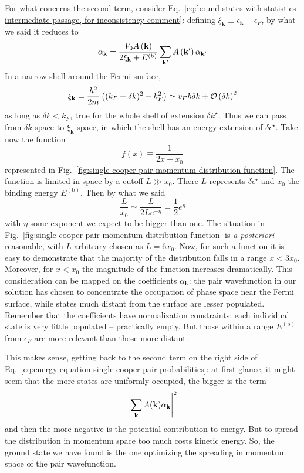 For what concerns the second term, consider Eq.~\eqref{eq:bound states with statistics intermediate passage, for inconsistency comment}: defining $\xi_\mathbf{k} \equiv \epsilon_\mathbf{k} - \epsilon_F$, by what we said it reduces to
\[
	\alpha_\mathbf{k} = \frac{V_0 A\left({\mathbf{k}}\right)}{2 \xi_\mathbf{k} + E^{(\mathrm{b})}} \sum_{\mathbf{k}'} A\left({\mathbf{k}'}\right) \alpha_{\mathbf{k}'}
\]
In a narrow shell around the Fermi surface,
\[
	\xi_\mathbf{k} = \frac{\hbar^2}{2m} \left({(k_F + \delta k)^2 - k_F^2}\right) \simeq v_F \hbar \delta k + \mathcal{O}\left({\delta k}\right)^2
\]
as long as $\delta k < k_F$, true for the whole shell of extension $\delta k^\star$. Thus we can pass from $\delta k$ space to $\xi_\mathbf{k}$ space, in which the shell has an energy extension of $\delta \epsilon^\star$. Take now the function
\[
	f(x) \equiv \frac{1}{2x+x_0}
\]
represented in Fig.~\ref{fig:single cooper pair momentum distribution function}. The function is limited in space by a cutoff $L \gg x_0$. There $L$ represents $\delta\epsilon^\star$ and $x_0$ the binding energy $E^{(\mathrm{b})}$. Then by what we said
\[
	\frac{L}{x_0} \simeq \frac{L}{2L e^{-\eta}} = \frac{1}{2} e^\eta
\]
with $\eta$ some exponent we expect to be bigger than one. The situation in Fig.~\ref{fig:single cooper pair momentum distribution function} is \textit{a posteriori} reasonable, with $L$ arbitrary chosen as $L=6x_0$. Now, for such a function it is easy to demonstrate that the majority of the distribution falls in a range $x < 3x_0$. Moreover, for $x<x_0$ the magnitude of the function increases dramatically. This consideration can be mapped on the coefficients $\alpha_\mathbf{k}$: the pair wavefunction in our solution has chosen to concentrate the occupation of phase space near the Fermi surface, while states much distant from the surface are lesser populated. Remember that the coefficients have normalization constraints: each individual state is very little populated -- practically empty. But those within a range $E^{(\mathrm{b})}$ from $\epsilon_F$ are more relevant than those more distant.

This makes sense, getting back to the second term on the right side of Eq.~\eqref{eq:energy equation single cooper pair probabilities}: at first glance, it might seem that the more states are uniformly occupied, the bigger is the term
\[
	\abs{\sum_\mathbf{k} A(\mathbf{k}) \alpha_\mathbf{k}}^2
\]
and then the more negative is the potential contribution to energy. But to spread the distribution in momentum space too much costs kinetic energy. So, the ground state we have found is the one optimizing the spreading in momentum space of the pair wavefunction.

